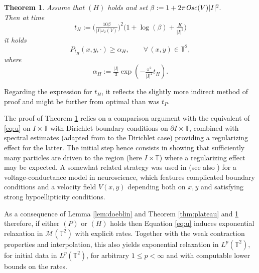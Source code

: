\documentclass[12pt]{article}
\newtheorem{thm}{Theorem}
\newcommand{\T}{\mathbb{T}}
\begin{document}
\begin{thm}\label{thm:Hor}
Assume that $(H)$ holds and set $\beta := 1 + 2\pi {\it Osc}(V)|I|^2.$\\
Then at time
\begin{equation}\label{def:tH}
t_H := \big( \tfrac{10\beta}{|I|\omega_2(V)}\big)^2 \big( 1 + \log(\beta) +
\tfrac{K}{|I|^2}\big) 
\end{equation}
it holds 
\begin{equation}\label{eq:lowerbH}
P_{t_H}(x,y,\cdot) \geq \alpha_H, \qquad \forall\, (x,y) \in \T^2,
\end{equation}
where 
$$
\alpha_H := \tfrac{|I|}{3} \exp(-\tfrac{\pi^2}{|I|^2} t_H).
$$
\end{thm}

Regarding the expression for $t_H$, it reflects the slightly more indirect 
method of proof and might be further from optimal than was $t_P.$ 

The proof of Theorem \ref{thm:Hor} relies on a comparison argument with 
the equivalent of \eqref{eq:u} on $I \times \T$ with Dirichlet boundary
conditions on $\partial I \times \T$, combined with spectral estimates 
(adapted from \cite{Wei21} to the Dirichlet case) providing a regularizing 
effect for the latter. The initial step hence consists in showing that sufficiently many particles
are driven to the region (here $I \times \T$) where a regularizing effect may be
expected. A somewhat related strategy was used in \cite{DoKoXuZh24} 
(see also \cite{FonMis24}) for a voltage-conductance model in neuroscience, 
which features complicated boundary 
conditions and a velocity field $V(x,y)$ depending both on $x,y$ and satisfying 
strong hypoellipticity conditions.

\medskip

As a consequence of Lemma \ref{lem:doeblin} and Theorem \ref{thm:plateau} and 
\ref{thm:Hor} therefore, if either $(P)$ or
$(H)$ holds then Equation \eqref{eq:u} induces exponential relaxation 
in $\mathcal{M}(\T^2)$ with explicit rates. Together with the weak contraction properties 
and interpolation, this also yields exponential relaxation in 
$L^p(\T^2)$, for initial data in $L^p(\T^2)$, for arbitrary $1 \leq p < \infty$ 
and with computable lower bounds on the rates.

\smallskip
\end{document}
